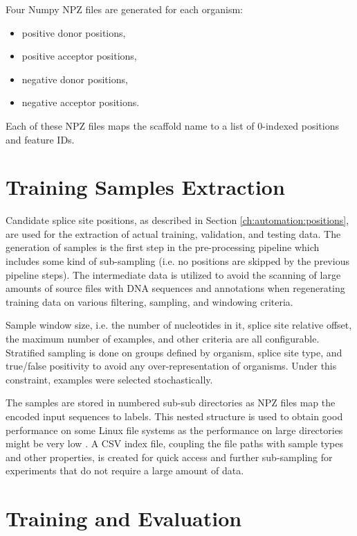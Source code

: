 Four Numpy NPZ files are generated for each organism:

\begin{itemize}
  \item positive donor positions,
  \item positive acceptor positions,
  \item negative donor positions,
  \item negative acceptor positions.
\end{itemize}

Each of these NPZ files maps the scaffold name to a list of 0-indexed positions
and feature IDs.

\section{\label{ch:automation:samples}Training Samples Extraction}

Candidate splice site positions, as described in Section
\ref{ch:automation:positions}, are used for the extraction of actual training,
validation, and testing data. The generation of samples is the first step in
the pre-processing pipeline which includes some kind of sub-sampling (i.e. no
positions are skipped by the previous pipeline steps). The intermediate data is
utilized to avoid the scanning of large amounts of source files with DNA
sequences and annotations when regenerating training data on various filtering,
sampling, and windowing criteria.

Sample window size, i.e. the number of nucleotides in it, splice site relative
offset, the maximum number of examples, and other criteria are all
configurable. Stratified sampling is done on groups defined by organism, splice
site type, and true/false positivity to avoid any over-representation of
organisms. Under this constraint, examples were selected stochastically.

The samples are stored in numbered sub-sub directories as NPZ files map the
encoded input sequences to labels. This nested structure is used to obtain good
performance on some Linux file systems as the performance on large directories
might be very low \cite{djordjevic2012ext4}. A CSV index file, coupling the
file paths with sample types and other properties, is created for quick access
and further sub-sampling for experiments that do not require a large amount of
data.

\section{\label{ch:automation:evaluation}Training and Evaluation}

